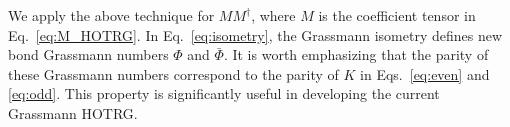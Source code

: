 We apply the above technique for $MM^{\dag}$, where $M$ is the coefficient tensor in Eq.~\eqref{eq:M_HOTRG}. In Eq.~\eqref{eq:isometry}, the Grassmann isometry defines new bond Grassmann numbers $\Phi$ and $\bar{\Phi}$. It is worth emphasizing that the parity of these Grassmann numbers correspond to the parity of $K$ in Eqs.~\eqref{eq:even} and \eqref{eq:odd}. This property is significantly useful in developing the current Grassmann HOTRG.













